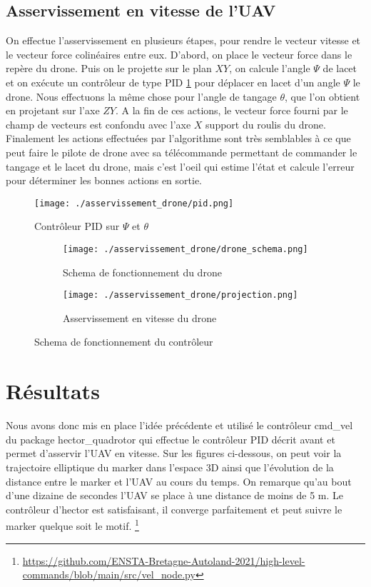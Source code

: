 \subsection{Asservissement en vitesse de l'UAV}
On effectue l’asservissement en plusieurs étapes, pour rendre le vecteur vitesse et le vecteur force colinéaires entre eux. 
D’abord, on place le vecteur force dans le repère du drone. Puis on le projette sur le plan $XY$, on calcule l’angle $\Psi$ de lacet et 
on exécute un contrôleur de type PID \ref{fig:pid} pour déplacer en lacet d’un angle $\Psi$ le drone. 
Nous effectuons la même chose pour l’angle de tangage $\theta$, que l’on obtient en projetant sur l’axe $ZY$. 
A la fin de ces actions, le vecteur force fourni par le champ de vecteurs est confondu avec l’axe $X$ 
support du roulis du drone. Finalement les actions effectuées par l’algorithme sont très semblables 
à ce que peut faire le pilote de drone avec sa télécommande permettant de commander le tangage et le lacet du drone, 
mais c’est l'oeil qui estime l’état et calcule l’erreur pour déterminer les bonnes actions en sortie. 

\begin{figure}[!htb]
    \centering
    \texttt{[image: ./asservissement\_drone/pid.png]}
    \caption{Contrôleur PID sur $\Psi$ et $\theta$}
    \label{fig:pid}
\end{figure}


\begin{figure}[!htb]
    \centering
    \begin{subfigure}[b]{0.4\textwidth}
        \centering
        \texttt{[image: ./asservissement\_drone/drone\_schema.png]}
        \caption{Schema de fonctionnement du drone}
        \label{fig:marker}
    \end{subfigure}
    \hfill
    \begin{subfigure}[b]{0.4\textwidth}
        \centering
        \texttt{[image: ./asservissement\_drone/projection.png]}
        \caption{Asservissement en vitesse du drone}
        \label{fig:manifold}
    \end{subfigure}
    \caption{Schema de fonctionnement du contrôleur}
    \label{fig:environnement}
\end{figure}

\section{Résultats}

Nous avons donc mis en place l’idée précédente et utilisé le contrôleur cmd\_vel
du package hector\_quadrotor qui effectue le contrôleur PID décrit avant et permet d’asservir l’UAV en vitesse.
Sur les figures ci-dessous, on peut voir la trajectoire elliptique du marker dans l’espace 3D ainsi que 
l’évolution de la distance entre le marker et l’UAV au cours du temps. 
On remarque qu’au bout d’une dizaine de secondes l’UAV se place à une distance de moins de 5 m. 
Le contrôleur d'hector est satisfaisant, il converge parfaitement et peut suivre le marker quelque soit
le motif. \footnote{\url{https://github.com/ENSTA-Bretagne-Autoland-2021/high-level-commands/blob/main/src/vel_node.py}}

